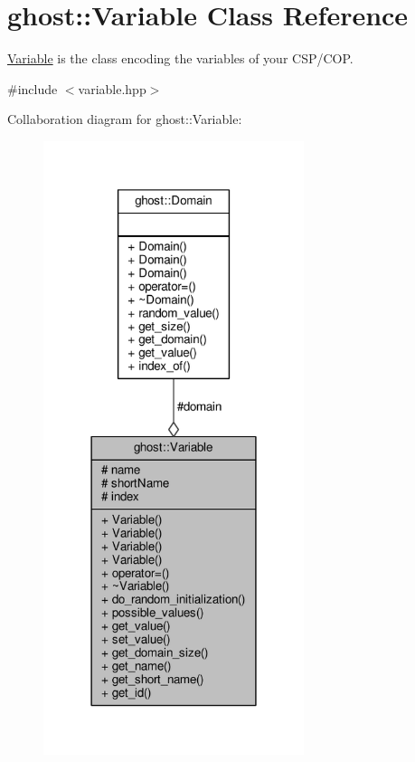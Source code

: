 \hypertarget{classghost_1_1Variable}{}\section{ghost\+:\+:Variable Class Reference}
\label{classghost_1_1Variable}


\hyperlink{classghost_1_1Variable}{Variable} is the class encoding the variables of your C\+S\+P/\+C\+OP.  




{\ttfamily \#include $<$variable.\+hpp$>$}



Collaboration diagram for ghost\+:\+:Variable\+:\nopagebreak
\begin{figure}[H]
\begin{center}
\leavevmode
\includegraphics[width=216pt]{classghost_1_1Variable__coll__graph}
\end{center}
\end{figure}
